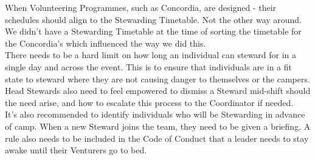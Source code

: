 When Volunteering Programmes, such as Concordia, are designed - their schedules should align to the Stewarding Timetable. Not the other way around. We didn't have a Stewarding Timetable at the time of sorting the timetable for the Concordia's which influenced the way we did this.\\

There needs to be a hard limit on how long an individual can steward for in a single day and across the event. This is to ensure that individuals are in a fit state to steward where they are not causing danger to themselves or the campers. Head Stewards also need to feel empowered to dismiss a Steward mid-shift should the need arise, and how to escalate this process to the Coordinator if needed. \\

It's also recommended to identify individuals who will be Stewarding in advance of camp. When a new Steward joins the team, they need to be given a briefing. A rule also needs to be included in the Code of Conduct that a leader needs to stay awake until their Venturers go to bed.
